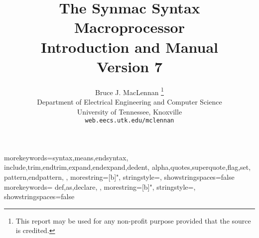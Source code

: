 \documentclass[12pt]{article}
\begin{document}
\def\Version{7}
\def\Tilde{\symbol{126}}%
\def\obrace{\pmb{\{}}
\def\cbrace{\pmb{\}}}
\newcommand{\word}[1]{{\bf #1}}
\newcommand{\nterm}[1]{\langle\mbox{#1}\rangle}
\def\nl{\nterm{newline}}
%
%
\newcommand{\Section}[2]{
\section{#2}
\label{sec:#1}
}
%
%
\newcommand{\Subsection}[1]{
\subsection{#1}
\label{sec:#1}
}
%
%
\newcommand{\Subsectiont}[2]{
\subsection{#2}
\label{sec:#1}
}
%
%
\newcommand{\Subsubsection}[1]{
\subsubsection{#1}
\label{sec:#1}
}
%
%
\newcommand{\neqn}[2]{\begin{equation}\label{eq:#1}
#2
\end{equation}}
%
%
\newcommand{\Future}[1]{
\begin{quote}
\emph{Idea:} #1
\end{quote}}
%
%
\def\Alt{\left\{ \begin{array}{l}}
\def\Endalt{\end{array} \right\}}
	{morekeywords={syntax,means,endsyntax,
	include,trim,endtrim,expand,endexpand,dedent,
	alpha,quotes,superquote,flag,set,
	pattern,endpattern,
	},
	morestring=[b]",
	stringstyle=\ttfamily,
	showstringspaces=false}
	{morekeywords={
	def,as,declare,
	},
	morestring=[b]",
	stringstyle=\ttfamily,
	showstringspaces=false}
\lstset{language=synmac}
\title{
The Synmac Syntax Macroprocessor\\
Introduction and Manual
\\[.2in]
{\large Version \Version}
}
\author{Bruce J. MacLennan%
\footnote{
This report may be used for any non-profit
purpose provided that the source is credited.
}\\[.2in]
Department of Electrical Engineering and Computer Science\\
University of Tennessee, Knoxville\\
{\tt web.eecs.utk.edu/\Tilde mclennan}
}
\end{document}
